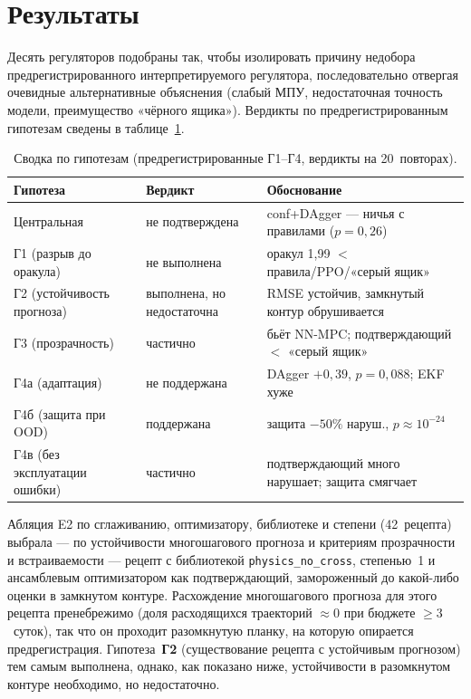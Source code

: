 \documentclass[preprint,3p]{elsarticle}
\begin{document}
\section{Результаты}
\label{sec:results}

Десять регуляторов подобраны так, чтобы изолировать причину недобора предрегистрированного
интерпретируемого регулятора, последовательно отвергая очевидные альтернативные объяснения
(слабый МПУ, недостаточная точность модели, преимущество «чёрного ящика»). Вердикты по
предрегистрированным гипотезам сведены в таблице~\ref{tab:scorecard}.

\begin{table}[t]
\centering
\caption{Сводка по гипотезам (предрегистрированные Г1--Г4, вердикты на 20~повторах).}
\label{tab:scorecard}
\small
\begin{tabular}{@{}p{2.2cm}p{2.4cm}p{3.0cm}@{}}
\toprule
Гипотеза & Вердикт & Обоснование \\
\midrule
Центральная & не подтверждена & conf+DAgger --- ничья с правилами ($p{=}0{,}26$) \\
Г1 (разрыв до оракула) & не выполнена & оракул 1,99 $<$ правила/PPO/«серый ящик» \\
Г2 (устойчивость прогноза) & выполнена, но недостаточна & RMSE устойчив, замкнутый контур обрушивается \\
Г3 (прозрачность) & частично & бьёт NN-MPC; подтверждающий $<$ «серый ящик» \\
Г4а (адаптация) & не поддержана & DAgger $+0{,}39$, $p{=}0{,}088$; EKF хуже \\
Г4б (защита при OOD) & поддержана & защита $-50\%$ наруш., $p{\approx}10^{-24}$ \\
Г4в (без эксплуатации ошибки) & частично & подтверждающий много нарушает; защита смягчает \\
\bottomrule
\end{tabular}
\end{table}

Абляция E2 по сглаживанию, оптимизатору, библиотеке и степени (42~рецепта) выбрала — по
устойчивости многошагового прогноза и критериям прозрачности и встраиваемости — рецепт с
библиотекой \texttt{physics\_no\_cross}, степенью~1 и ансамблевым оптимизатором как
подтверждающий, замороженный до какой-либо оценки в замкнутом контуре. Расхождение
многошагового прогноза для этого рецепта пренебрежимо (доля расходящихся траекторий
$\approx 0$ при бюджете $\ge 3$~суток), так что он проходит разомкнутую планку, на которую
опирается предрегистрация. Гипотеза~\textbf{Г2} (существование рецепта с устойчивым прогнозом)
тем самым выполнена, однако, как показано ниже, устойчивости в разомкнутом контуре
необходимо, но недостаточно.
\end{document}
